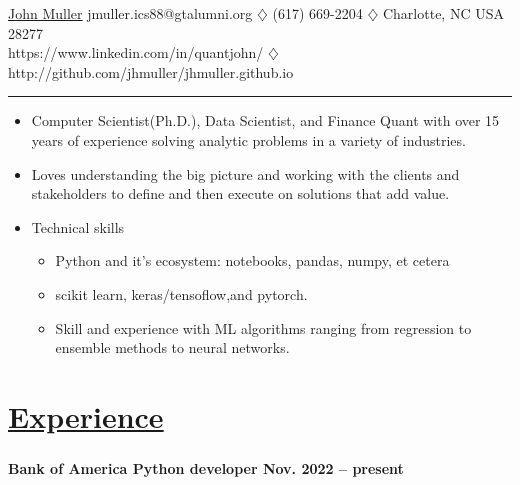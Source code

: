 \documentclass[
]{article}
\author{}
\date{}
\providecommand{\tightlist}{%
  \setlength{\itemsep}{0pt}\setlength{\parskip}{0pt}}
\begin{document}
{\LARGE \underline{John Muller}}
\vspace{0.1in}
\hfill\break
jmuller.ics88@gtalumni.org $\diamondsuit$  (617) 669-2204  $\diamondsuit$  Charlotte, NC USA 28277\\
https://www.linkedin.com/in/quantjohn/ $\diamondsuit$ http://github.com/jhmuller/jhmuller.github.io \\

\vspace{-18pt}

\begin{center}
\rule{0.5\textwidth}{.4pt}
\end{center}

\vspace{-2pt}
\begin{itemize}
\item  Computer Scientist(Ph.D.), Data Scientist, and Finance Quant with over 15 years of experience solving analytic problems in a variety of industries.
\item Loves understanding the big picture and working with the clients and stakeholders to define and then execute on solutions that add value. 
\item Technical skills
  \begin{itemize}
	\tightlist
	\item Python and it's ecosystem: notebooks, pandas, numpy, et cetera 
	\item scikit learn, keras/tensoflow,and pytorch.
	\item Skill and experience with ML algorithms ranging from regression to ensemble methods to neural networks.
 \end{itemize}
\end{itemize}
 
\vspace{6pt}
\hypertarget{professional-experience}{\section{\texorpdfstring{\underline{\textbf{Experience}}}{Professional Experience}}\label{professional-experience}}
\vspace{-16pt}
{\subsubsection{} \label{BofA}}
{\textbf {Bank of America \hfill  Python developer \hfill Nov. 2022 -- present}}
\end{document}
